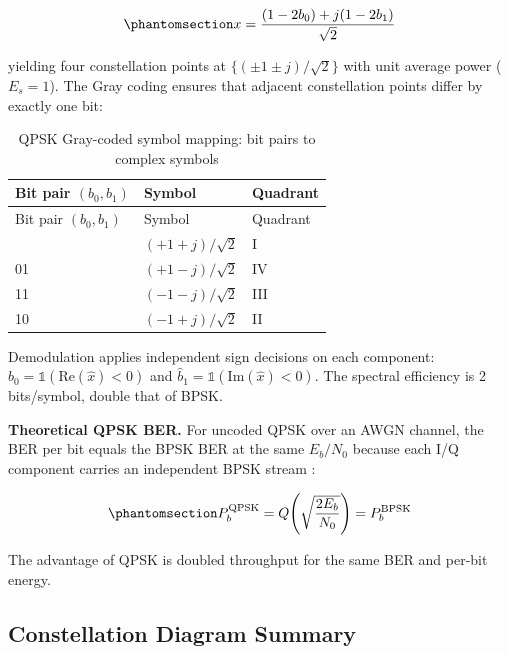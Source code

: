 \begin{equation}\protect\phantomsection\label{eq:qpsk-mapping}{x = \frac{(1 - 2b_0) + j(1 - 2b_1)}{\sqrt{2}}
}\end{equation}

yielding four constellation points at \(\{(\pm 1 \pm j)/\sqrt{2}\}\) with unit average power (\(E_s = 1\)). The Gray coding ensures that adjacent constellation points differ by exactly one bit:

\begin{longtable}[]{@{}lll@{}}
\caption[QPSK Gray-coded symbol mapping]{QPSK Gray-coded symbol mapping: bit pairs to complex symbols}\label{tbl:table29}\tabularnewline
\toprule\noalign{}
Bit pair \((b_0, b_1)\) & Symbol & Quadrant \\
\midrule\noalign{}
\endfirsthead
\toprule\noalign{}
Bit pair \((b_0, b_1)\) & Symbol & Quadrant \\
\midrule\noalign{}
\endhead
\bottomrule\noalign{}
\endlastfoot
00 & \((+1+j)/\sqrt{2}\) & I \\
01 & \((+1-j)/\sqrt{2}\) & IV \\
11 & \((-1-j)/\sqrt{2}\) & III \\
10 & \((-1+j)/\sqrt{2}\) & II \\
\end{longtable}

Demodulation applies independent sign decisions on each component: \(\hat{b}_0 = \mathbb{1}(\text{Re}(\hat{x}) < 0)\) and \(\hat{b}_1 = \mathbb{1}(\text{Im}(\hat{x}) < 0)\). The spectral efficiency is 2 bits/symbol, double that of BPSK.

\textbf{Theoretical QPSK BER.} For uncoded QPSK over an AWGN channel, the BER per bit equals the BPSK BER at the same \(E_b/N_0\) because each I/Q component carries an independent BPSK stream \cite{ProakisSalehi2008DigitalComm}:

\begin{equation}\protect\phantomsection\label{eq:qpsk-ber}{P_b^{\text{QPSK}} = Q\!\left(\sqrt{\frac{2E_b}{N_0}}\right) = P_b^{\text{BPSK}}
}\end{equation}

The advantage of QPSK is doubled throughput for the same BER and per-bit energy.

\subsection{Constellation Diagram Summary}\label{sec:constellation-diagram-summary}


